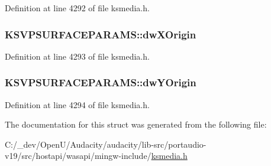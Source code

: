 Definition at line 4292 of file ksmedia.\+h.

\subsubsection[{\texorpdfstring{dw\+X\+Origin}{dwXOrigin}}]{ K\+S\+V\+P\+S\+U\+R\+F\+A\+C\+E\+P\+A\+R\+A\+M\+S\+::dw\+X\+Origin}\hypertarget{struct_k_s_v_p_s_u_r_f_a_c_e_p_a_r_a_m_s_ad99b73793f1390860f2f2b749235704e}{}\label{struct_k_s_v_p_s_u_r_f_a_c_e_p_a_r_a_m_s_ad99b73793f1390860f2f2b749235704e}


Definition at line 4293 of file ksmedia.\+h.

\subsubsection[{\texorpdfstring{dw\+Y\+Origin}{dwYOrigin}}]{ K\+S\+V\+P\+S\+U\+R\+F\+A\+C\+E\+P\+A\+R\+A\+M\+S\+::dw\+Y\+Origin}\hypertarget{struct_k_s_v_p_s_u_r_f_a_c_e_p_a_r_a_m_s_a8c9c96fe694fdea9da6249e6e76d4e5b}{}\label{struct_k_s_v_p_s_u_r_f_a_c_e_p_a_r_a_m_s_a8c9c96fe694fdea9da6249e6e76d4e5b}


Definition at line 4294 of file ksmedia.\+h.



The documentation for this struct was generated from the following file\+:\begin{DoxyCompactItemize}
\item 
C\+:/\+\_\+dev/\+Open\+U/\+Audacity/audacity/lib-\/src/portaudio-\/v19/src/hostapi/wasapi/mingw-\/include/\hyperlink{ksmedia_8h}{ksmedia.\+h}\end{DoxyCompactItemize}
